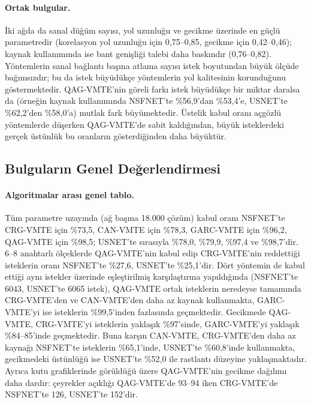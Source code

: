 \documentclass[10pt,twocolumn]{article}
\begin{document}
\paragraph{Ortak bulgular.} İki ağda da sanal düğüm sayısı, yol uzunluğu ve gecikme üzerinde en güçlü parametredir (korelasyon yol uzunluğu için 0,75--0,85, gecikme için 0,42--0,46); kaynak kullanımında ise bant genişliği talebi daha baskındır (0,76--0,82). Yöntemlerin sanal bağlantı başına atlama sayısı istek boyutundan büyük ölçüde bağımsızdır; bu da istek büyüdükçe yöntemlerin yol kalitesinin korunduğunu göstermektedir. QAG-VMTE'nin göreli farkı istek büyüdükçe bir miktar daralsa da (örneğin kaynak kullanımında NSFNET'te \%56,9'dan \%53,4'e, USNET'te \%62,2'den \%58,0'a) mutlak fark büyümektedir. Üstelik kabul oranı açgözlü yöntemlerde düşerken QAG-VMTE'de sabit kaldığından, büyük isteklerdeki gerçek üstünlük bu oranların gösterdiğinden daha büyüktür.

\subsection*{Bulguların Genel Değerlendirmesi}

\paragraph{Algoritmalar arası genel tablo.} Tüm parametre uzayında (ağ başına 18.000 çözüm) kabul oranı NSFNET'te CRG-VMTE için \%73,5, CAN-VMTE için \%78,3, GARC-VMTE için \%96,2, QAG-VMTE için \%98,5; USNET'te sırasıyla \%78,0, \%79,9, \%97,4 ve \%98,7'dir. 6--8 anahtarlı ölçeklerde QAG-VMTE'nin kabul edip CRG-VMTE'nin reddettiği isteklerin oranı NSFNET'te \%27,6, USNET'te \%25,1'dir. Dört yöntemin de kabul ettiği aynı istekler üzerinde eşleştirilmiş karşılaştırma yapıldığında (NSFNET'te 6043, USNET'te 6065 istek), QAG-VMTE ortak isteklerin neredeyse tamamında CRG-VMTE'den ve CAN-VMTE'den daha az kaynak kullanmakta, GARC-VMTE'yi ise isteklerin \%99,5'inden fazlasında geçmektedir. Gecikmede QAG-VMTE, CRG-VMTE'yi isteklerin yaklaşık \%97'sinde, GARC-VMTE'yi yaklaşık \%84--85'inde geçmektedir. Buna karşın CAN-VMTE, CRG-VMTE'den daha az kaynağı NSFNET'te isteklerin \%65,1'inde, USNET'te \%60,8'inde kullanmakta, gecikmedeki üstünlüğü ise USNET'te \%52,0 ile rastlantı düzeyine yaklaşmaktadır. Ayrıca kutu grafiklerinde görüldüğü üzere QAG-VMTE'nin gecikme dağılımı daha dardır: çeyrekler açıklığı QAG-VMTE'de 93--94 iken CRG-VMTE'de NSFNET'te 126, USNET'te 152'dir.
\end{document}
